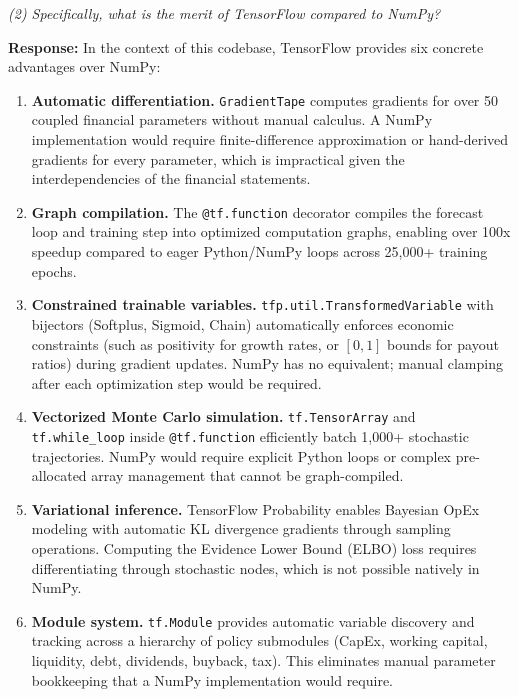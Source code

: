 \documentclass[12pt,a4paper]{article}
\begin{document}
\emph{(2) Specifically, what is the merit of TensorFlow compared to
NumPy?}

\textbf{Response:} In the context of this codebase, TensorFlow provides
six concrete advantages over NumPy:

\begin{enumerate}
\item \textbf{Automatic differentiation.}
  \texttt{GradientTape} computes gradients for over 50 coupled financial
  parameters without manual calculus. A NumPy implementation would
  require finite-difference approximation or hand-derived gradients for
  every parameter, which is impractical given the interdependencies of the
  financial statements.

\item \textbf{Graph compilation.}
  The \texttt{@tf.function} decorator compiles the forecast loop and
  training step into optimized computation graphs, enabling over 100x
  speedup compared to eager Python/NumPy loops across 25{,}000+ training
  epochs.

\item \textbf{Constrained trainable variables.}
  \texttt{tfp.util.TransformedVariable} with bijectors (Softplus,
  Sigmoid, Chain) automatically enforces economic constraints (such as
  positivity for growth rates, or $[0, 1]$ bounds for payout
  ratios) during gradient updates. NumPy has no equivalent; manual
  clamping after each optimization step would be required.

\item \textbf{Vectorized Monte Carlo simulation.}
  \texttt{tf.TensorArray} and \texttt{tf.while\_loop} inside
  \texttt{@tf.function} efficiently batch 1{,}000+ stochastic
  trajectories. NumPy would require explicit Python loops or complex
  pre-allocated array management that cannot be graph-compiled.

\item \textbf{Variational inference.}
  TensorFlow Probability enables Bayesian OpEx modeling with automatic
  KL divergence gradients through sampling operations. Computing the
  Evidence Lower Bound (ELBO) loss requires differentiating through
  stochastic nodes, which is not possible natively in NumPy.

\item \textbf{Module system.}
  \texttt{tf.Module} provides automatic variable discovery and tracking
  across a hierarchy of policy submodules (CapEx, working capital,
  liquidity, debt, dividends, buyback, tax). This eliminates manual
  parameter bookkeeping that a NumPy implementation would require.
\end{enumerate}
\end{document}
